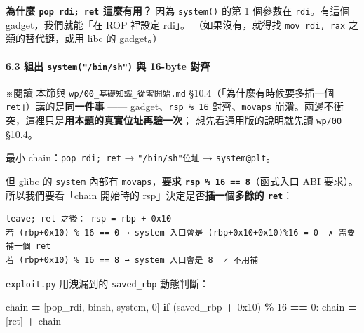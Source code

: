 \documentclass[10pt,a4paper]{article}
\newenvironment{Shaded}{\begin{snugshade}}{\end{snugshade}}
\newcommand{\BaseNTok}[1]{\textcolor[rgb]{0.00,0.00,0.81}{#1}}
\newcommand{\ControlFlowTok}[1]{\textcolor[rgb]{0.13,0.29,0.53}{\textbf{#1}}}
\newcommand{\DecValTok}[1]{\textcolor[rgb]{0.00,0.00,0.81}{#1}}
\newcommand{\NormalTok}[1]{#1}
\newcommand{\OperatorTok}[1]{\textcolor[rgb]{0.81,0.36,0.00}{\textbf{#1}}}
\renewenvironment{Shaded}{%
  \def\FrameCommand{\fboxsep=3.2pt\colorbox{shadecolor}}%
  \MakeFramed{\advance\hsize-\width\FrameRestore\small}%
}{%
  \endMakeFramed
}
\renewenvironment{quote}{%
  \begin{mdframed}[linewidth=0pt,innerleftmargin=0pt,innerrightmargin=0pt,
    innerbottommargin=0pt,innertopmargin=0pt,skipabove=0.55em,skipbelow=0.55em,
    leftmargin=0.9em,rightmargin=0.4em,startcode={\color{quotebar}\vrule width 2.6pt},%
    endcode={}]%
  \itshape\color{black}%
}{%
  \end{mdframed}%
}
\begin{document}
\textbf{為什麼 \texttt{pop\ \allowbreak{}rdi;\ \allowbreak{}ret} 這麼有用？} 因為
\texttt{system()} 的第 1 個參數在 \texttt{rdi}。有這個
gadget，我們就能「在 ROP 裡設定 rdi」。 （如果沒有，就得找
\texttt{mov\ \allowbreak{}rdi,\allowbreak{}\ \allowbreak{}rax} 之類的替代鏈，或用 libc 的 gadget。）

\paragraph{\texorpdfstring{6.3 組出 \texttt{system("/\allowbreak{}bin/\allowbreak{}sh")} 與
16-byte
對齊}{6.3 組出 system("/bin/sh") 與 16-byte 對齊}}\label{ux7d44ux51fa-systembinsh-ux8207-16-byte-ux5c0dux9f4a}

\begin{quote}
※閱讀 本節與 \texttt{wp/\allowbreak{}00\_\allowbreak{}基礎知識\_\allowbreak{}從零開始.\allowbreak{}md}
§10.4（「為什麼有時候要多插一個 \texttt{ret}」）講的是\textbf{同一件事}
------ gadget、\texttt{rsp\ \allowbreak{}\%\allowbreak{}\ \allowbreak{}16} 對齊、\texttt{movaps}
崩潰。兩邊不衝突，這裡只是\textbf{用本題的真實位址再驗一次}；
想先看通用版的說明就先讀 \texttt{wp/\allowbreak{}00} §10.4。
\end{quote}

最小 chain：\texttt{pop\ \allowbreak{}rdi;\ \allowbreak{}ret} → \texttt{"/\allowbreak{}bin/\allowbreak{}sh"位址} →
\texttt{system@plt}。

但 glibc 的 \texttt{system} 內部有 \texttt{movaps}，\textbf{要求
\texttt{rsp\ \allowbreak{}\%\allowbreak{}\ \allowbreak{}16\ \allowbreak{}==\ \allowbreak{}8}}（函式入口 ABI 要求）。 所以我們要看「chain
開始時的 rsp」決定是否\textbf{插一個多餘的 \texttt{ret}}：

\begin{Verbatim}[breaklines=true,breakanywhere=true,breakautoindent=false,fontsize=\fontsize{7.0}{9.5}\selectfont]
leave; ret 之後： rsp = rbp + 0x10
若 (rbp+0x10) % 16 == 0 → system 入口會是 (rbp+0x10+0x10)%16 = 0  ✗ 需要補一個 ret
若 (rbp+0x10) % 16 == 8 → system 入口會是 8  ✓ 不用補
\end{Verbatim}

\texttt{exploit.\allowbreak{}py} 用洩漏到的 \texttt{saved\_\allowbreak{}rbp} 動態判斷：

\begin{Shaded}
\begin{Highlighting}[]
\NormalTok{chain }\OperatorTok{=}\NormalTok{ [pop\_rdi, binsh, system, }\DecValTok{0}\NormalTok{]}
\ControlFlowTok{if}\NormalTok{ (saved\_rbp }\OperatorTok{+} \BaseNTok{0x10}\NormalTok{) }\OperatorTok{\%} \DecValTok{16} \OperatorTok{==} \DecValTok{0}\NormalTok{:}
\NormalTok{    chain }\OperatorTok{=}\NormalTok{ [ret] }\OperatorTok{+}\NormalTok{ chain}
\end{Highlighting}
\end{Shaded}
\end{document}
